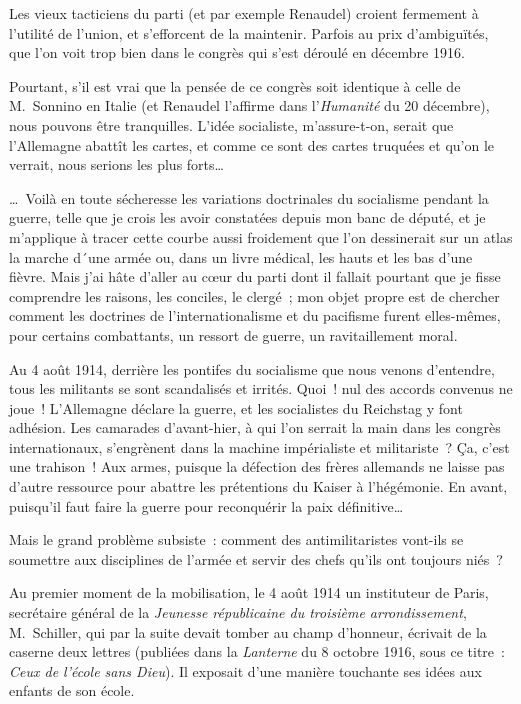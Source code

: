 \documentclass[french,twoside]{book} %
\begin{document}
\noindent Les vieux tacticiens du parti (et par exemple Renaudel) croient fermement à l’utilité de l’union, et s’efforcent de la maintenir. Parfois au prix d’ambiguïtés, que l’on voit trop bien dans le congrès qui s’est déroulé en décembre 1916.‌\par
Pourtant, s’il est vrai que la pensée de ce congrès soit identique à celle de M. Sonnino en Italie (et Renaudel l’affirme dans l’{\itshape Humanité} du 20 décembre), nous pouvons être tranquilles. L’idée socialiste, m’assure-t-on, serait que l’Allemagne abattît les cartes, et comme ce sont des cartes truquées et qu’on le verrait, nous serions les plus forts…‌\par
… Voilà en toute sécheresse les variations doctrinales du socialisme pendant la guerre, telle que je crois les avoir constatées depuis mon banc de député, et je m’applique à tracer cette courbe aussi froidement que l’on dessinerait sur un atlas la marche d´une armée ou, dans un livre médical, les hauts et les bas d’une fièvre. Mais j’ai hâte d’aller au cœur du parti dont il fallait pourtant que je fisse comprendre les raisons, les conciles, le clergé ; mon objet propre est de chercher comment les doctrines de l’internationalisme et du pacifisme furent elles-mêmes, pour certains combattants, un ressort de guerre, un ravitaillement moral.\par
Au 4 août 1914, derrière les pontifes du socialisme que nous venons d’entendre, tous les militants se sont scandalisés et irrités. Quoi ! nul des accords convenus ne joue ! L’Allemagne déclare la guerre, et les socialistes du Reichstag y font adhésion. Les camarades d’avant-hier, à qui l’on serrait la main dans les congrès internationaux, s’engrènent dans la machine impérialiste et militariste ? Ça, c’est une trahison ! Aux armes, puisque la défection des frères allemands ne laisse pas d’autre ressource pour abattre les prétentions du Kaiser à l’hégémonie. En avant, puisqu’il faut faire la guerre pour reconquérir la paix définitive…‌\par
Mais le grand problème subsiste : comment des antimilitaristes vont-ils se soumettre aux disciplines de l’armée et servir des chefs qu’ils ont toujours niés ?‌\par
Au premier moment de la mobilisation, le 4 août 1914 un instituteur de Paris, secrétaire général de la {\itshape Jeunesse républicaine du troisième arrondissement}, M. Schiller, qui par la suite devait tomber au champ d’honneur, écrivait de la caserne deux lettres (publiées dans la {\itshape Lanterne} du 8 octobre 1916, sous ce titre : {\itshape Ceux de l’école sans Dieu}). Il exposait d’une manière touchante ses idées aux enfants de son école.‌\par
\end{document}
